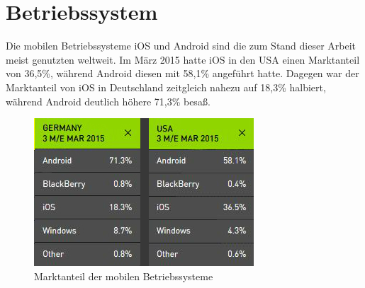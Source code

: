 \section{Betriebssystem}
	Die mobilen Betriebssysteme iOS und Android sind die zum Stand dieser Arbeit
	meist genutzten weltweit. Im März 2015 hatte iOS in den USA einen
	Marktanteil von 36,5\%, während Android diesen mit 58,1\% angeführt hatte.
	Dagegen war der Marktanteil von iOS in Deutschland zeitgleich nahezu auf 18,3\%
	halbiert, während Android deutlich höhere 71,3\% besaß\cite{MobileOsStat}.
	\begin{figure}[h]
		\centering
		\includegraphics[width=0.5\linewidth]{ios/media/marketshare-cmp-201503.jpg}
		\caption{Marktanteil der mobilen Betriebssysteme
		\cite{MobileOsStat}}
		\label{fig:marcetshare}
	\end{figure}